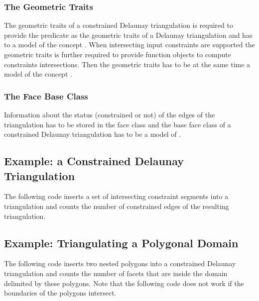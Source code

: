 \subsubsection{The Geometric Traits}
 The geometric traits 
of a constrained Delaunay triangulation is required
to provide the  predicate as the geometric traits
of a Delaunay triangulation and has to a model of the concept
. When intersecting input
constraints
are supported the geometric traits is further required 
to provide function objects to compute constraints intersections.
Then the geometric traits has to be at the same time a model
of the concept .



\subsubsection{The Face Base Class}
Information about the status (constrained or not)
of the edges of the triangulation has to be stored
in the face class
 and the base face class
of a constrained Delaunay triangulation has to be a model
of .




\subsection{Example: a  Constrained Delaunay Triangulation\label{Subsection_2D_Triangulations_Constrained_Delaunay_Example}}
The following code inserts a set of intersecting constraint segments
into a triangulation 
and counts the number of constrained edges of the
resulting triangulation.


\subsection{Example: Triangulating a Polygonal Domain\label{Subsection_2D_Triangulations_Polygon_triangulation}}
The following code inserts two nested polygons into a constrained Delaunay triangulation and counts the number of facets that
are inside the domain delimited by these polygons. Note that the following code does not work if the 
boundaries of the polygons intersect.

